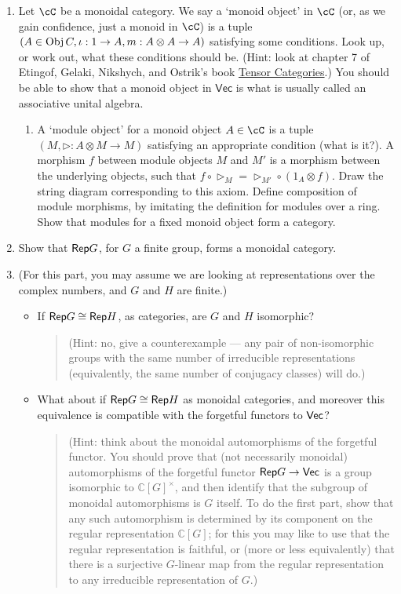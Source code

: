 \documentclass[12pt]{amsart}
\begin{document}
\begin{enumerate}
\item Let $\cC$ be a monoidal category. We say a `monoid object' in $\cC$ (or, as we gain confidence, just a monoid in $\cC$) is a tuple $(A \in \Obj C, \iota: 1 \to A, m: A \otimes A \to A)$ satisfying some conditions. Look up, or work out, what these conditions should be. (Hint: look at chapter 7 of Etingof, Gelaki, Nikshych, and Ostrik's book \href{http://www-math.mit.edu/~etingof/egnobookfinal.pdf}{Tensor Categories}.) You should be able to show that a monoid object in $\mathsf{Vec}$ is what is usually called an associative unital algebra.
\begin{enumerate}
\item A `module object' for a monoid object $A \in \cC$ is a tuple $(M, \triangleright: A \otimes M \to M)$ satisfying an appropriate condition (what is it?). A morphism $f$ between module objects $M$ and $M'$ is a morphism between the underlying objects, such that $f \circ \triangleright_M = \triangleright_{M'} \circ (1_A \otimes f)$. Draw the string diagram corresponding to this axiom. Define composition of module morphisms, by imitating the definition for modules over a ring. Show that modules for a fixed monoid object form a category.
\end{enumerate}
\item Show that $\Rep G$, for $G$ a finite group, forms a monoidal category.
\item (For this part, you may assume we are looking at representations over the complex numbers, and $G$ and $H$ are finite.)
\begin{itemize}
\item If $\Rep G \cong \Rep H$, as categories, are $G$ and $H$ isomorphic?
\begin{quote}
(Hint: no, give a counterexample --- any pair of non-isomorphic groups with the same number of irreducible representations (equivalently, the same number of conjugacy classes) will do.)
\end{quote}
\item
What about if $\Rep G \cong \Rep H$ as monoidal categories, and moreover this equivalence is compatible with the forgetful functors to $\Vec$?
\begin{quote}
(Hint: think about the monoidal automorphisms of the forgetful functor. You should prove that (not necessarily monoidal) automorphisms of the forgetful functor $\Rep G \to \Vec$ is a group isomorphic to $\mathbb C[G]^{\times}$, and then identify that the subgroup of monoidal automorphisms is $G$ itself. To do the first part, show that any such automorphism is determined by its component on the regular representation $\mathbb C[G]$; for this you may like to use that the regular representation is faithful, or (more or less equivalently) that there is a surjective $G$-linear map from the regular representation to any irreducible representation of $G$.)

\end{quote}
\end{itemize}
\end{enumerate}
\end{document}
